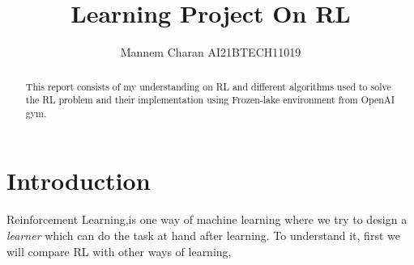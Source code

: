 \documentclass[journal,12pt,onecolumn]{IEEEtran}
\theoremstyle{remark}
\numberwithin{equation}{section}
\begin{document}
		\title{Learning Project On RL}
		\author{ Mannem Charan AI21BTECH11019}
		 \maketitle
		\begin{abstract}
		This report consists of my understanding on RL and different algorithms used to solve the RL problem and their implementation using Frozen-lake environment from OpenAI gym.
	       \end{abstract}

	       \tableofcontents

     \section{Introduction}
     Reinforcement Learning,is one way of machine learning where we try to design a \emph{learner} which can do the task at hand after learning.
       To understand it, first we will compare RL with other ways of learning,
\end{document}
